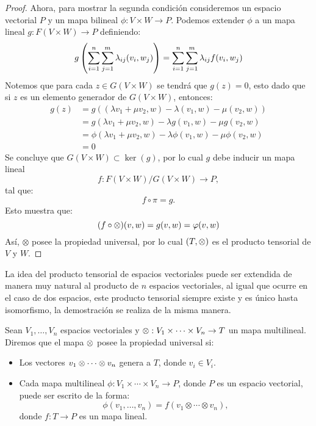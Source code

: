 \begin{proof}
	Ahora, para mostrar la segunda condición consideremos un espacio vectorial
	$P$ y un mapa bilineal $\phi: V \times W \to P$. Podemos extender $\phi$ a
	un mapa lineal $g: F(V \times W) \to P$ definiendo:
	\[
		g\left(\sum_{i=1}^{n}\sum_{j=1}^{m}\lambda_{ij} (v_i,w_j)\right)
		=
		\sum_{i=1}^{n}\sum_{j=1}^{m} \lambda_{ij}f(v_i,w_j)
	\]
	Notemos que para cada $z \in G(V \times W)$ se tendrá que $g(z) = 0$, esto
	dado que si $z$ es un elemento generador de $G(V \times W)$, entonces:
	\begin{align*}
		g(z) & = g((\lambda v_1 + \mu v_2, w) - \lambda(v_1,w)   -\mu(v_2,w))    \\
		     & = g(\lambda v_1 + \mu v_2,  w) - \lambda g(v_1,w) -\mu g(v_2,w)   \\
		     & = \phi(\lambda v_1+\mu v_2, w) -\lambda\phi(v_1,w)-\mu\phi(v_2,w) \\
		     & = 0
	\end{align*}
	Se concluye que $G(V \times W) \subset \ker(g)$, por lo cual $g$ debe inducir un mapa
	lineal
	\[ f: F(V \times W) / G (V \times W) \to P, \]
	tal que:
	\[
		f \circ \pi = g.
	\]
	Esto muestra que:
	\[
		(f \circ \otimes)(v,w) = g(v,w) = \varphi(v,w)
	\]
	Así, $\otimes$ posee la propiedad universal, por lo cual $(T, \otimes)$ es el
	producto tensorial de $V$ y $W$.
\end{proof}

La idea del producto tensorial de espacios vectoriales puede ser extendida de
manera muy natural al producto de $n$ espacios vectoriales, al igual que ocurre
en el caso de dos espacios, este producto tensorial siempre existe y es único
hasta isomorfismo, la demostración se realiza de la misma manera.

\begin{definition}
	Sean $V_1, \ldots, V_n$ espacios vectoriales y $\otimes: V_1 \times \cdots \times
		V_n \to T$ un mapa multilineal. Diremos que el mapa $\otimes$ posee la propiedad
	universal si:
	\begin{itemize}
		\item Los vectores $v_1 \otimes\cdots\otimes v_n$ genera a $T$, donde $v_i\in V_i$.
		\item Cada mapa multilineal $\phi: V_1 \times \cdots \times V_n \to P$,
		      donde $P$ es un espacio vectorial, puede ser escrito de la forma:
		      \[ \phi(v_1,\ldots,v_n) = f(v_1 \otimes \cdots \otimes v_n), \]
		      donde $f: T \to P$ es un mapa lineal.
	\end{itemize}
\end{definition}

